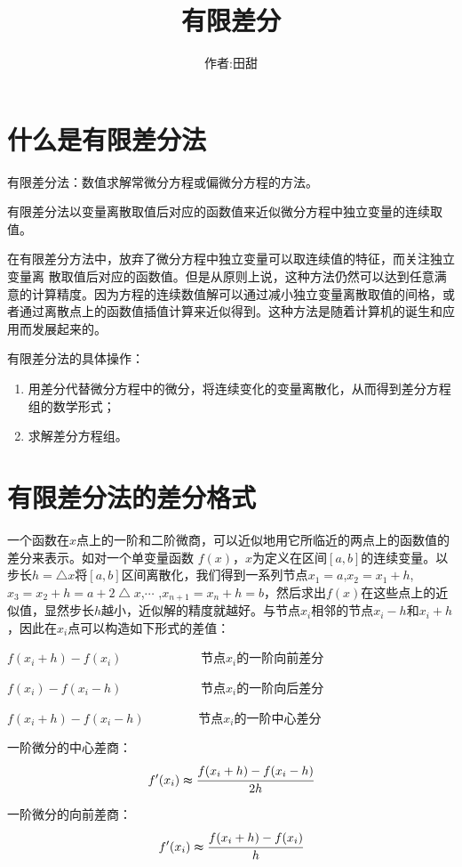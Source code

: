 \documentclass[12pt,a4paper]{article}
\title{有限差分}
\author{作者:田甜}
\date{\chntoday}
\begin{document}
\maketitle
\newpage
\section{什么是有限差分法}
有限差分法：数值求解常微分方程或偏微分方程的方法。

有限差分法以变量离散取值后对应的函数值来近似微分方程中独立变量的连续取值。

在有限差分方法中，放弃了微分方程中独立变量可以取连续值的特征，而关注独立变量离
散取值后对应的函数值。但是从原则上说，这种方法仍然可以达到任意满意的计算精度。因为方程的连续数值解可以通过减小独立变量离散取值的间格，或者通过离散点上的函数值插值计算来近似得到。这种方法是随着计算机的诞生和应用而发展起来的。

有限差分法的具体操作：
\begin{enumerate}[(1)]
	\item 用差分代替微分方程中的微分，将连续变化的变量离散化，从而得到差分方程组的数学形式；
	\item 求解差分方程组。
\end{enumerate}

\section{有限差分法的差分格式}

一个函数在$x$点上的一阶和二阶微商，可以近似地用它所临近的两点上的函数值的差分来表示。如对一个单变量函数 $f(x)$，$x$为定义在区间$[a,b]$的连续变量。以步长$h=\bigtriangleup x$将$[a,b]$区间离散化，我们得到一系列节点$x_1=a$,$x_2=x_1+h$,$x_3=x_2+h=a+2\bigtriangleup x$,$\cdots$ ,$x_{n+1}=x_n+h=b$，然后求出$f(x)$在这些点上的近似值，显然步长$h$越小，近似解的精度就越好。与节点$x_i$相邻的节点$x_i-h$和$x_i+h$，因此在$x_i$点可以构造如下形式的差值：

$f(x_i+h)-f(x_i)$ $\qquad \qquad \qquad$节点$x_i$的一阶向前差分

$f(x_i)-f(x_i-h)$ $\qquad \qquad \qquad$节点$x_i$的一阶向后差分

$f(x_i+h)-f(x_i-h)$ $\qquad \qquad $节点$x_i$的一阶中心差分

一阶微分的中心差商：
\begin{equation}
f'(x_i)\thickapprox \cfrac {f(x_i+h)-f(x_i-h)}{2h}
\end{equation}

一阶微分的向前差商：
\begin{equation}
f'(x_i)\thickapprox \cfrac {f(x_i+h)-f(x_i)}{h}
\end{equation}
\end{document}
